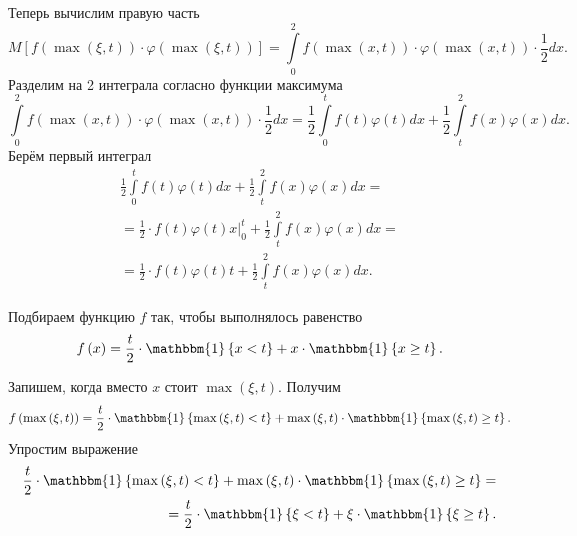 \begin{enumerate}[label=\alph*)]
  Теперь вычислим правую часть
  $$M \left[
      f \left( \max \left( \xi, t \right) \right) \cdot
      \varphi \left( \max \left( \xi, t \right) \right)
    \right] =
    \int \limits_0^2
      f \left( \max \left( x, t \right) \right) \cdot
      \varphi \left( \max \left( x, t \right) \right) \cdot \frac{1}{2}
    dx.$$
  Разделим на 2 интеграла согласно функции максимума
  $$ \int \limits_0^2
      f \left( \max \left( x, t \right) \right) \cdot
      \varphi \left( \max \left( x, t \right) \right) \cdot \frac{1}{2}
    dx =
    \frac{1}{2} \int \limits_0^t f \left( t \right) \varphi \left( t \right) dx +
    \frac{1}{2} \int \limits_t^2 f \left( x \right) \varphi \left( x \right) dx.$$
  Берём первый интеграл
  \begin{equation*}
    \begin{split}
      \frac{1}{2} \int \limits_0^t f \left( t \right) \varphi \left( t \right) dx +
      \frac{1}{2} \int \limits_t^2 f \left( x \right) \varphi \left( x \right) dx = \\
      = \frac{1}{2} \cdot \left. f \left( t \right) \varphi \left( t \right) x \right|_0^t +
      \frac{1}{2} \int \limits_t^2 f \left( x \right) \varphi \left( x \right) dx = \\
      = \frac{1}{2} \cdot f \left( t \right) \varphi \left( t \right) t +
      \frac{1}{2} \int \limits_t^2 f \left( x \right) \varphi \left( x \right) dx.
    \end{split}
  \end{equation*}

  Подбираем функцию $f$ так, чтобы выполнялось равенство
  $$f \left( x \right) =
    \frac{t}{2} \cdot \mathbbm{1} \left\{ x < t \right\} +
    x \cdot \mathbbm{1} \left\{ x \geq t \right\}.$$

  Запишем, когда вместо $x$ стоит $ \max \left( \xi, t \right) $.
  Получим
  $$f \left( \max \left( \xi, t \right) \right) =
    \frac{t}{2} \cdot \mathbbm{1} \left\{ \max \left( \xi, t \right) < t \right\} +
    \max \left( \xi, t \right) \cdot
    \mathbbm{1} \left\{ \max \left( \xi, t \right) \geq t \right\}.$$
  Упростим выражение
  \begin{equation*}
    \begin{split}
      \frac{t}{2} \cdot \mathbbm{1} \left\{ \max \left( \xi, t \right) < t \right\} +
      \max \left( \xi, t \right) \cdot
      \mathbbm{1} \left\{ \max \left( \xi, t \right) \geq t \right\} = \\
      = \frac{t}{2} \cdot \mathbbm{1} \left\{ \xi < t \right\} +
      \xi \cdot \mathbbm{1} \left\{ \xi \geq t \right\}.
    \end{split}
  \end{equation*}
\end{enumerate}


